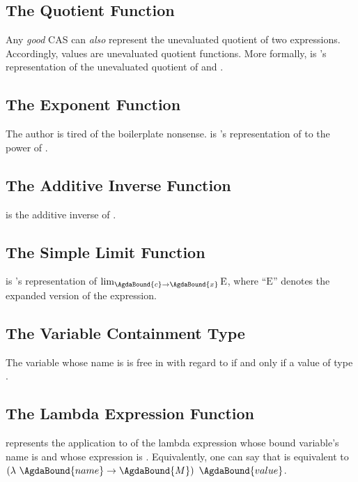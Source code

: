 \documentclass{report}
\begin{document}
\subsection{The Quotient Function}
Any \emph{good} CAS can \emph{also} represent the unevaluated quotient of two expressions.  Accordingly, \AgdaField{\AgdaUnderscore{}/\AgdaUnderscore{}} values are unevaluated quotient functions.  More formally,     is 's representation of the unevaluated quotient of  and .

\subsection{The Exponent Function}
The author is tired of the boilerplate nonsense.      is 's representation of  to the power of .

\subsection{The Additive Inverse Function}
   is the additive inverse of .

\subsection{The Simple Limit Function}
     is 's representation of \(\lim_{\AgdaBound{c} \rightarrow \AgdaBound{x}} \textrm{E}\), where ``\(\textrm{E}\)'' denotes the expanded version of the  expression.  %

\subsection{The Variable Containment Type}
The variable whose name is  is free in  with regard to  if and only if a value of type    .

\subsection{The Lambda Expression Function}
     represents the application to  of the lambda expression whose bound variable's name is  and whose expression is .  Equivalently, one can say that      is equivalent to \(\left(\lambda\ \AgdaBound{name} \rightarrow \AgdaBound{M}\right)\ \AgdaBound{value}\).
\end{document}
